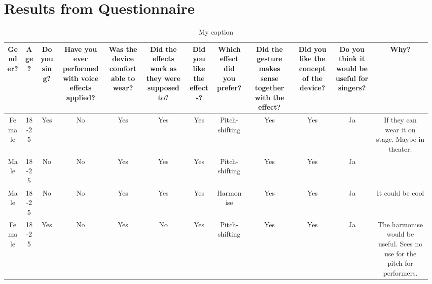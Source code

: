 \section{Results from Questionnaire}\label{AX}
\begin{table}[]
\centering
\caption{My caption}
\label{my-label}
\begin{tabular}{|c|c|c|c|c|c|c|c|c|c|c|c|}
\hline
Gender? & Age?  & Do you sing? & Have you ever performed with voice effects applied? & Was the device comfortable to wear? & Did the effects work as they were supposed to? & Did you like the effects? & Which effect did you prefer? & Did the gesture makes sense together with the effect? & Did you like the concept of the device? & Do you think it would be useful for singers? & Why?                                                                                                                \\ \hline
Female  & 18-25 & Yes          & No                                                  & Yes                                 & Yes                                            & Yes                       & Pitch-shifting               & Yes                                                   & Yes                                     & Ja                                           & If they can wear it on stage. Maybe in theater.                                                                     \\ \hline
Male    & 18-25 & No           & No                                                  & Yes                                 & Yes                                            & Yes                       & Pitch-shifting               & Yes                                                   & Yes                                     & Ja                                           &                                                                                                                     \\ \hline
Male    & 18-25 & No           & No                                                  & Yes                                 & Yes                                            & Yes                       & Harmonise                    & Yes                                                   & Yes                                     & Ja                                           & It could be cool                                                                                                    \\ \hline
Female  & 18-25 & Yes          & No                                                  & Yes                                 & No                                             & Yes                       & Pitch-shifting               & Yes                                                   & Yes                                     & Ja                                           & The harmonise would be useful. Sees no use for the pitch for performers.                                            \\ \hline

\end{tabular}
\end{table}
